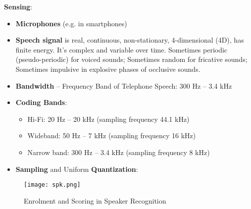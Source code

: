 \documentclass[a4paper]{article}
\begin{document}
      \textbf{Sensing}:
      \begin{itemize}
        \item \textbf{Microphones} (e.g. in smartphones)
        \item \textbf{Speech signal} is real, continuous, non-stationary, 4-dimensional (4D), has finite energy. It's complex and variable over time. Sometimes periodic (pseudo-periodic) for voiced sounds; Sometimes random for fricative sounds; Sometimes impulsive in explosive phases of occlusive sounds.
        \item \textbf{Bandwidth} -- Frequency Band of Telephone Speech: 300 Hz -- 3.4 kHz
        \item \textbf{Coding Bands}:
        \begin{itemize}
          \item Hi-Fi: 20 Hz -- 20 kHz (sampling frequency 44.1 kHz)
          \item Wideband: 50 Hz -- 7 kHz (sampling frequency 16 kHz)
          \item Narrow band: 300 Hz -- 3.4 kHz (sampling frequency 8 kHz)
        \end{itemize}
        \item \textbf{Sampling} and Uniform \textbf{Quantization}: \todo[inline]{}
      \end{itemize}

      \begin{figure}[htp]
        \centering
          \texttt{[image: spk.png]}
          \caption{Enrolment and Scoring in Speaker Recognition}
          \label{fig:spk}
      \end{figure}
\end{document}
